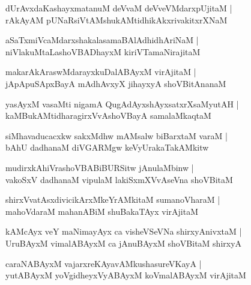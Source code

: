 \documentclass[twoside,12pt,openright]{book}
\newcounter{shloka}[chapter]
\begin{document}
\begin{shloka}%
dUrAvxdaKashayxmatanuM deVvaM deVveVMdarxpUjitaM |\\
rAkAyAM pUNaRsiVtAMshukAMtidhikAkxrivakitxrXNaM 
\end{shloka}

\begin{shloka}%
aSaTxmiVcaMdarxshakalasamaBAlAdhidhAriNaM |\\
niVlakuMtaLashoVBADhayxM kiriVTamaNirajitaM 
\end{shloka}

\begin{shloka}%
makarAkAraswMdarayxkuDalABAyxM virAjitaM |\\
jApApuSApxBayA mAdhAvxyX jihayxyA shoVBitAnanaM 
\end{shloka}

\begin{shloka}%
yasAyxM vasaMti nigamA QugAdAyxshAyxsatxrXsaMyutAH |\\
kaMBukAMtidharagirxVvAshoVBayA samalaMkaqtaM 
\end{shloka}

\begin{shloka}%
siMhavaducacxkw sakxMdhw mAMsalw biBarxtaM varaM |\\
bAhU dadhanaM diVGARMgw keVyUrakaTakAMkitw
\end{shloka}

\begin{shloka}%
mudirxkAhiVrashoVBABiBURSitw jAnulaMbinw |\\
vakoSxV dadhanaM vipulaM lakiSxmXVvAseVna shoVBitaM 
\end{shloka}

\begin{shloka}%
shirxVvatAsxdivicikArxMkeYrAMkitaM sumanoVharaM |\\
mahoVdaraM mahanABiM shuBakaTAyx virAjitaM 
\end{shloka}

\begin{shloka}%
kAMcAyx veY maNimayAyx ca visheVSeVNa shirxyAnivxtaM |\\
UruBAyxM vimalABAyxM ca jAnuBAyxM shoVBitaM shirxyA 
\end{shloka}

\begin{shloka}%
caraNABAyxM vajarxreKAyavAMkushasureVKayA |\\
yutABAyxM yoVgidheyxVyABAyxM koVmalABAyxM virAjitaM 
\end{shloka}
\end{document}
